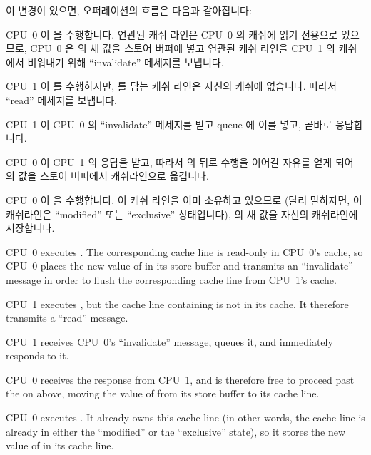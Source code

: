 \begin{fcvref}
이 변경이 있으면, 오퍼레이션의 흐름은 다음과 같아집니다:

\iffalse

With this change, the sequence of operations might be as follows:

\fi

\begin{sequence}
\item	CPU~0 이  을 수행합니다.
	연관된 캐쉬 라인은 CPU~0 의 캐쉬에 읽기 전용으로 있으므로, CPU~0 은
	 의 새 값을 스토어 버퍼에 넣고 연관된 캐쉬 라인을 CPU~1 의
	캐쉬에서 비워내기 위해 ``invalidate'' 메세지를 보냅니다.
\item	CPU~1 이  를 수행하지만,  를 담는
	캐쉬 라인은 자신의 캐쉬에 없습니다.
	따라서 ``read'' 메세지를 보냅니다.
\item	CPU~1 이 CPU~0 의 ``invalidate'' 메세지를 받고 queue 에 이를 넣고,
	곧바로 응답합니다.
\item	CPU~0 이 CPU~1 의 응답을 받고, 따라서  의 
	뒤로 수행을 이어갈 자유를 얻게 되어  의 값을 스토어 버퍼에서
	캐쉬라인으로 옮깁니다.
\item	CPU~0 이  을 수행합니다.
	이 캐쉬 라인을 이미 소유하고 있으므로 (달리 말하자면, 이 캐쉬라인은
	``modified'' 또는 ``exclusive'' 상태입니다),  의 새 값을 자신의
	캐쉬라인에 저장합니다.

\iffalse

\item	CPU~0 executes .  The corresponding
	cache line is read-only in
	CPU~0's cache, so CPU~0 places the new value of  in its
	store buffer and transmits an ``invalidate'' message in order
	to flush the corresponding cache line from CPU~1's cache.
\item	CPU~1 executes , but the cache line
	containing  is not in its cache.
	It therefore transmits a ``read'' message.
\item	CPU~1 receives CPU~0's ``invalidate'' message, queues it, and
	immediately responds to it.
\item	CPU~0 receives the response from CPU~1, and is therefore free
	to proceed past the  on  above, moving
	the value of  from its store buffer to its cache line.
\item	CPU~0 executes .
	It already owns this cache line (in other words, the cache line
	is already in either the ``modified'' or the ``exclusive'' state),
	so it stores the new value of  in its cache line.


\end{sequence}
\end{fcvref}
